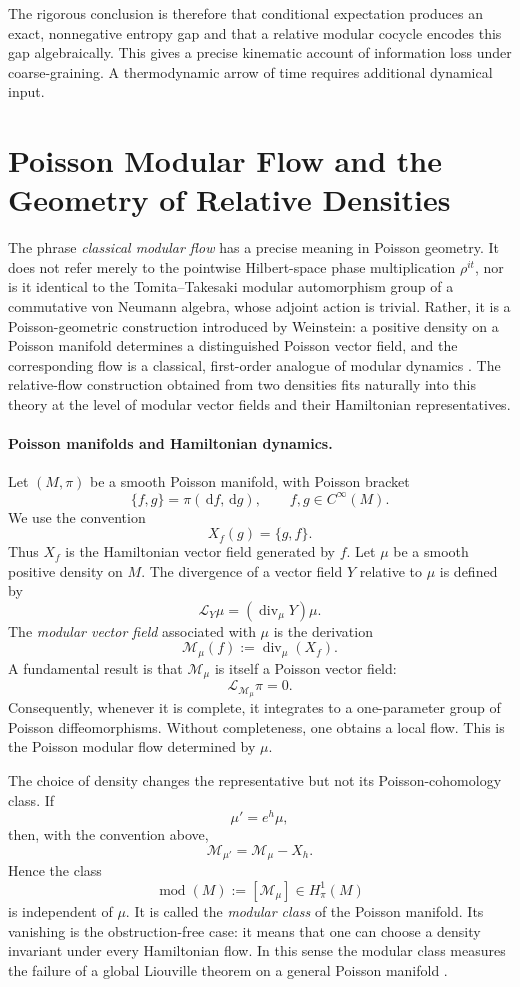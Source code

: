 \documentclass[a4paper,11pt]{article}
\theoremstyle{definition}
\newcommand{\dd}{\,\mathrm{d}}
\newcommand{\Div}{\operatorname{div}}
\newcommand{\cL}{\mathcal{L}}
\begin{document}
The rigorous conclusion is therefore that conditional expectation produces an exact, nonnegative entropy gap and that a relative modular cocycle encodes this gap algebraically.  This gives a precise kinematic account of information loss under coarse-graining.  A thermodynamic arrow of time requires additional dynamical input.


\section{Poisson Modular Flow and the Geometry of Relative Densities}

The phrase \emph{classical modular flow} has a precise meaning in Poisson geometry.  It does not refer merely to the pointwise Hilbert-space phase multiplication $\rho^{it}$, nor is it identical to the Tomita--Takesaki modular automorphism group of a commutative von Neumann algebra, whose adjoint action is trivial.  Rather, it is a Poisson-geometric construction introduced by Weinstein: a positive density on a Poisson manifold determines a distinguished Poisson vector field, and the corresponding flow is a classical, first-order analogue of modular dynamics \cite{Weinstein1997,Kosmann2008}.  The relative-flow construction obtained from two densities fits naturally into this theory at the level of modular vector fields and their Hamiltonian representatives.

\paragraph{Poisson manifolds and Hamiltonian dynamics.}
Let $(M,\pi)$ be a smooth Poisson manifold, with Poisson bracket
\[
\{f,g\}=\pi(\dd f,\dd g),
\qquad f,g\in C^{\infty}(M).
\]
We use the convention
\[
X_f(g)=\{g,f\}.
\]
Thus $X_f$ is the Hamiltonian vector field generated by $f$.  Let $\mu$ be a smooth positive density on $M$.  The divergence of a vector field $Y$ relative to $\mu$ is defined by
\[
\cL_Y\mu=(\Div_\mu Y)\mu.
\]
The \emph{modular vector field} associated with $\mu$ is the derivation
\[
\mathcal{M}_\mu(f):=\Div_\mu(X_f).
\]
A fundamental result is that $\mathcal{M}_\mu$ is itself a Poisson vector field:
\[
\cL_{\mathcal{M}_\mu}\pi=0.
\]
Consequently, whenever it is complete, it integrates to a one-parameter group of Poisson diffeomorphisms.  Without completeness, one obtains a local flow.  This is the Poisson modular flow determined by $\mu$.

The choice of density changes the representative but not its Poisson-cohomology class.  If
\[
\mu'=e^h\mu,
\]
then, with the convention above,
\[
\mathcal{M}_{\mu'}=\mathcal{M}_\mu-X_h.
\]
Hence the class
\[
\operatorname{mod}(M):=[\mathcal{M}_\mu]\in H^1_\pi(M)
\]
is independent of $\mu$.  It is called the \emph{modular class} of the Poisson manifold.  Its vanishing is the obstruction-free case: it means that one can choose a density invariant under every Hamiltonian flow.  In this sense the modular class measures the failure of a global Liouville theorem on a general Poisson manifold \cite{Weinstein1997,Kosmann2008}.
\end{document}
